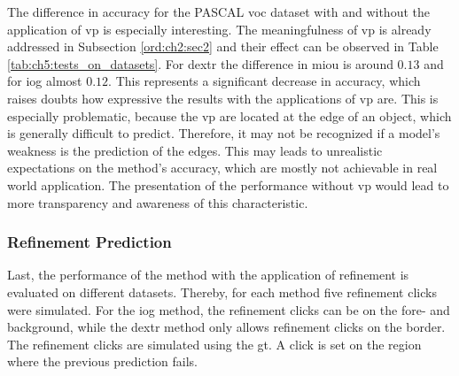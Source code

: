 The difference in accuracy for the PASCAL \gls{voc} dataset \cite{Eve20-PascalVOC} with and without the application of \gls{vp} is especially interesting.
The meaningfulness of \gls{vp} is already addressed in Subsection \ref{ord:ch2:sec2} and their effect can be observed in Table \ref{tab:ch5:tests_on_datasets}.
For \gls{dextr} the difference in \gls{miou} is around $ 0.13 $ and for \gls{iog} almost $ 0.12 $.
This represents a significant decrease in accuracy, which raises doubts how expressive the results with the applications of \gls{vp} are.
This is especially problematic, because the \gls{vp} are located at the edge of an object, which is generally difficult to predict.
Therefore, it may not be recognized if a model's weakness is the prediction of the edges.
This may leads to unrealistic expectations on the method's accuracy, which are mostly not achievable in real world application.
The presentation of the performance without \gls{vp} would lead to more transparency and awareness of this characteristic.

\subsubsection{Refinement Prediction}

Last, the performance of the method with the application of refinement is evaluated on different datasets.
Thereby, for each method five refinement clicks were simulated.
For the \gls{iog} method, the refinement clicks can be on the fore- and background, while the \gls{dextr} method only allows refinement clicks on the border.
The refinement clicks are simulated using the \gls{gt}.
A click is set on the region where the previous prediction fails.

